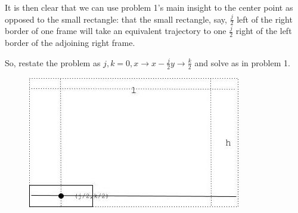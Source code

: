 \documentclass[11pt, oneside]{article} 	%
\begin{document}
It is then clear that we can use problem 1's main insight to the center point as opposed to the small rectangle: that the small rectangle, say, $\frac{j}{2}$ left of the right border of one frame will take an equivalent trajectory to one $\frac{j}{2}$ right of the left border of the adjoining right frame.

So, restate the problem as $j, k = 0, x \rightarrow x - \frac{j}{2} y \rightarrow \frac{k}{2}$ and solve as in problem 1.

\begin{figure}[!htb]
\centering
\includegraphics[scale=.5]{problem2}
\end{figure}
\end{document}
